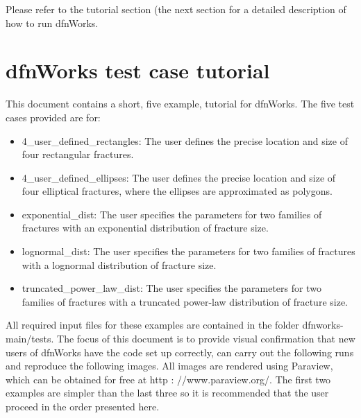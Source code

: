 \documentclass[letterpaper,10pt,english]{sphinxmanual}
\begin{document}
Please refer to the tutorial section (the next section for a detailed description of how to run dfnWorks.


\chapter{dfnWorks test case tutorial}
\label{examples:dfnworks-test-case-tutorial}\label{examples::doc}
This document contains a short, five example, tutorial for dfnWorks. The five test cases provided are for:
\begin{itemize}
\item {} 
4\_user\_defined\_rectangles: The user defines the precise location and size of four rectangular fractures.

\item {} 
4\_user\_defined\_ellipses: The user defines the precise location and size of four elliptical fractures, where the ellipses are approximated as polygons.

\item {} 
exponential\_dist: The user specifies the parameters for two families of fractures with an exponential distribution of fracture size.

\item {} 
lognormal\_dist: The user specifies the parameters for two families of fractures with a lognormal distribution of fracture size.

\item {} 
truncated\_power\_law\_dist: The user specifies the parameters for two families of fractures with a truncated power-law distribution of fracture size.

\end{itemize}

All required input files for these examples are contained in the folder dfnworks-main/tests. The focus of this document is to provide visual confirmation that new users of dfnWorks have the code set up correctly, can carry out the following runs and reproduce the following images. All images are rendered using Paraview, which can be obtained for free at http : //www.paraview.org/. The first two examples are simpler than the last three so it is recommended that the user proceed in the order presented here.
\end{document}
